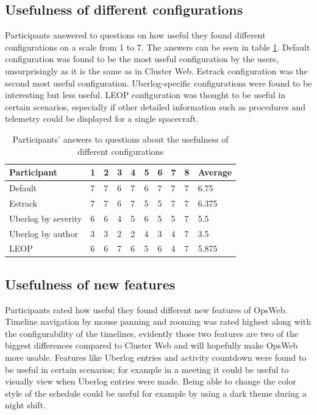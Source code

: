 \subsection{Usefulness of different configurations}
Participants answered to questions on how useful they found different configurations on a scale from 1 to 7. The answers can be seen in table \ref{config_usefulness}. Default configuration was found to be the most useful configuration by the users, unsurprisingly as it is the same as in Cluster Web. Estrack configuration was the second most useful configuration. Uberlog-specific configurations were found to be interesting but less useful. LEOP configuration was thought to be useful in certain scenarios, especially if other detailed information such as procedures and telemetry could be displayed for a single spacecraft.

\begin{table}[!ht]
\def\arraystretch{1.1}%
    \begin{center}
    \caption{Participants' answers to questions about the usefulness of different configurations}
    \label{config_usefulness}
    \begin{tabular}{| l | l | l | l | l | l | l | l | l | l | }
    \hline
    Participant & 1 & 2 & 3 & 4 & 5 & 6 & 7 & 8 & Average  \\
    \hline
    Default    & 7  & 7 & 6 & 7 & 6 & 7 & 7 & 7 & 6.75   \\
    Estrack    & 7  & 7 & 6 & 7 & 5 & 5 & 7 & 7 & 6.375   \\
    Uberlog by severity    & 6  & 6 & 4 & 5 & 6 & 5 & 5 & 7 & 5.5   \\
    Uberlog by author    & 3  & 3 & 2 & 2 & 4 & 3 & 4 & 7 & 3.5   \\
    LEOP    & 6  & 6 & 7 & 6 & 5 & 6 & 4 & 7 & 5.875   \\
    \hline
    \end{tabular}
    \end{center}
\end{table}

\subsection{Usefulness of new features}
Participants rated how useful they found different new features of OpsWeb. Timeline navigation by mouse panning and zooming was rated highest along with the configurability of the timelines, evidently those two features are two of the biggest differences compared to Cluster Web and will hopefully make OpsWeb more usable. Features like Uberlog entries and activity countdown were found to be useful in certain scenarios; for example in a meeting it could be useful to visually view when Uberlog entries were made. Being able to change the color style of the schedule could be useful for example by using a dark theme during a night shift.

